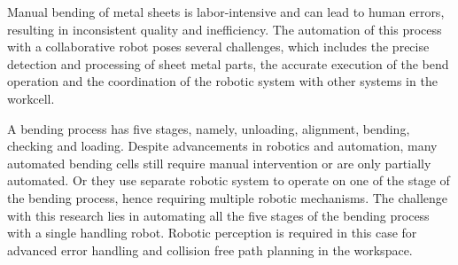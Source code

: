 Manual bending of metal sheets is labor-intensive and can 
lead to human errors, resulting in inconsistent quality
and inefficiency. 
The automation of this process with a collaborative robot poses
several challenges, which includes the precise detection and processing of sheet metal parts, the accurate execution of
the bend operation and the coordination of
the robotic system with other systems in the workcell.

A bending process has five stages, namely, unloading, alignment, bending, checking and loading.
Despite advancements in robotics and automation, many automated bending cells still require manual intervention or are only partially automated. Or they use separate robotic system to operate on one of the stage of the bending process, hence requiring multiple robotic mechanisms. The challenge with this research lies in automating all the five stages of the bending process with a single handling robot. Robotic perception is required in this case for advanced error handling and collision free path planning in the workspace.

